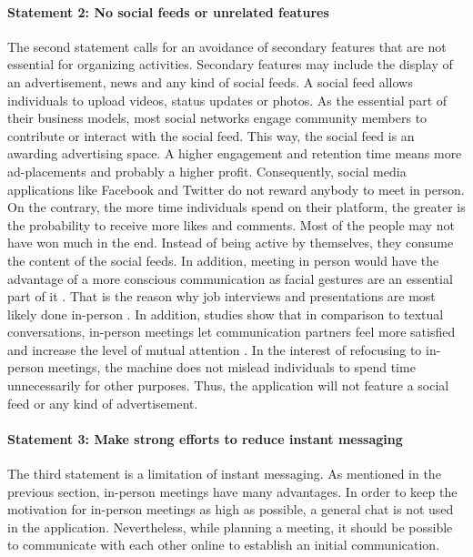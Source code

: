 \documentclass[12pt,numbers=noenddot,parskip,bibliography=totocnumbered,listof=totocnumbered,draft]{scrreprt}
\begin{document}
\paragraph{Statement 2: No social feeds or unrelated features}
The second statement calls for an avoidance of secondary features that are not essential for organizing activities. Secondary features may include the display of an advertisement, news and any kind of social feeds. A social feed allows individuals to upload videos, status updates or photos. As the essential part of their business models, most social networks engage community members to contribute or interact with the social feed. This way, the social feed is an awarding advertising space. A higher engagement and retention time means more ad-placements and probably a higher profit. Consequently, social media applications like Facebook and Twitter do not reward anybody to meet in person. On the contrary, the more time individuals spend on their platform, the greater is the probability to receive more likes and comments. Most of the people may not have won much in the end. Instead of being active by themselves, they consume the content of the social feeds. In addition, meeting in person would have the advantage of a more conscious communication as facial gestures are an essential part of it  \citep{vanderkam2017}. That is the reason why job interviews and presentations are most likely done in-person \citep{vanderkam2017}. In addition, studies show that in comparison to textual conversations, in-person meetings let communication partners feel more satisfied and increase the level of mutual attention \citep{vanderkam2017}. \newline
In the interest of refocusing to in-person meetings, the machine does not mislead individuals to spend time unnecessarily for other purposes. Thus, the application will not feature a social feed or any kind of advertisement.

\paragraph{Statement 3: Make strong efforts to reduce instant messaging}
The third statement is a limitation of instant messaging. As mentioned in the previous section, in-person meetings have many advantages. In order to keep the motivation for in-person meetings as high as possible, a general chat is not used in the application. Nevertheless, while planning a meeting, it should be possible to communicate with each other online to establish an initial communication.
\end{document}
